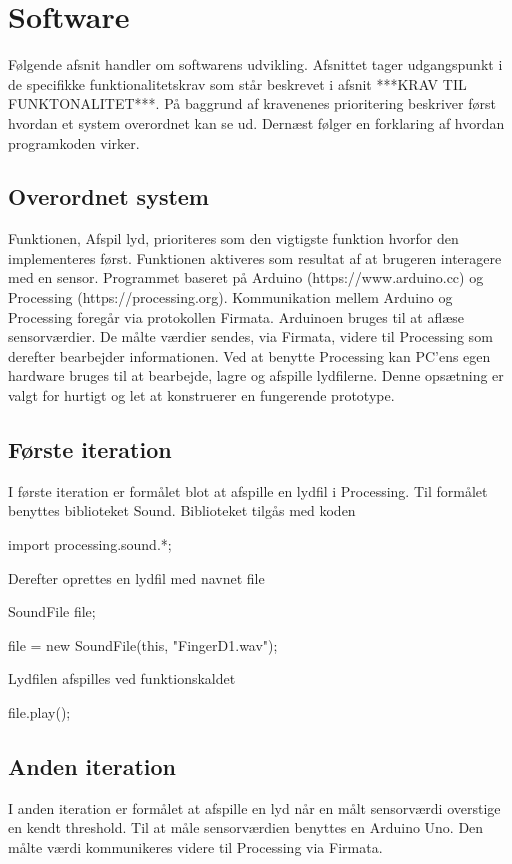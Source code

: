 \chapter{Software}
\label{software}
Følgende afsnit handler om softwarens udvikling. Afsnittet tager udgangspunkt i de specifikke funktionalitetskrav som står beskrevet i afsnit ***KRAV TIL FUNKTONALITET***. På baggrund af kravenenes prioritering beskriver først hvordan et system overordnet kan se ud. Dernæst følger en  forklaring af hvordan programkoden virker.

\section{Overordnet system}
Funktionen, Afspil lyd, prioriteres som den vigtigste funktion hvorfor den implementeres først. Funktionen aktiveres som resultat af at brugeren interagere med en sensor.   
Programmet baseret på Arduino (https://www.arduino.cc) og Processing (https://processing.org). Kommunikation mellem Arduino og Processing foregår via protokollen Firmata. 
 Arduinoen bruges til at aflæse sensorværdier. De målte værdier sendes, via Firmata, videre til Processing som derefter bearbejder informationen.
 Ved at benytte Processing kan PC'ens egen hardware bruges til at bearbejde, lagre og afspille lydfilerne. Denne opsætning er valgt for hurtigt og let at konstruerer en fungerende prototype. 

\section{Første iteration}
I første iteration er formålet blot at afspille en lydfil i Processing. Til formålet benyttes biblioteket Sound. Biblioteket tilgås med koden
 
import processing.sound.*;

Derefter oprettes en lydfil med navnet file 

SoundFile file;  
 
file = new SoundFile(this, "FingerD1.wav");

Lydfilen afspilles ved funktionskaldet 

file.play();

\section{Anden iteration}
I anden iteration er formålet at afspille en lyd når en målt sensorværdi overstige en kendt threshold.   Til at måle sensorværdien benyttes en Arduino Uno. Den målte værdi kommunikeres videre til Processing via Firmata. 
 
